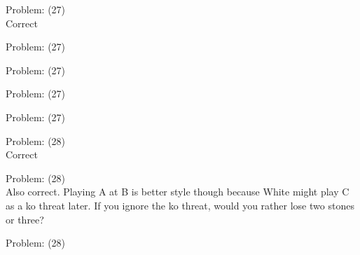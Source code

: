 \documentclass[11pt]{article}
\begin{document}
\begin{minipage}[t]{0.5\textwidth}
  {\centering
  
Problem: (27)\\
Correct\\
  }
\end{minipage}
\begin{minipage}[t]{0.5\textwidth}
  {\centering
  
Problem: (27)\\
  }
\end{minipage}
\begin{minipage}[t]{0.5\textwidth}
  {\centering
  
Problem: (27)\\
  }
\end{minipage}
\begin{minipage}[t]{0.5\textwidth}
  {\centering
  
Problem: (27)\\
  }
\end{minipage}
\begin{minipage}[t]{0.5\textwidth}
  {\centering
  
Problem: (27)\\
  }
\end{minipage}
\begin{minipage}[t]{0.5\textwidth}
  {\centering
  
Problem: (28)\\
Correct\\
  }
\end{minipage}
\begin{minipage}[t]{0.5\textwidth}
  {\centering
  
Problem: (28)\\
Also correct. Playing A at B is better style though because White might play C as a ko threat later. If you ignore the ko threat, would you rather lose two stones or three?\\
  }
\end{minipage}
\begin{minipage}[t]{0.5\textwidth}
  {\centering
  
Problem: (28)\\
  }
\end{minipage}
\end{document}
